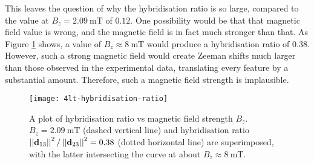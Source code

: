 This leaves the question of why the hybridisation ratio is so large, compared to the value at $B_z=\qty{2.09}{\milli\tesla}$ of $\num{0.12}$. One possibility would be that that magnetic field value is wrong, and the magnetic field is in fact much stronger than that. As Figure \ref{fig:4lt_hybridisation_ratio} shows, a value of $B_z\approx\qty{8}{\milli\tesla}$ would produce a hybridisation ratio of $\num{0.38}$. However, such a strong magnetic field would create Zeeman shifts much larger than those observed in the experimental data, translating every feature by a substantial amount. Therefore, such a magnetic field strength is implausible.

\begin{figure}[h]
\centering
\texttt{[image: 4lt-hybridisation-ratio]}
\caption{\label{fig:4lt_hybridisation_ratio} A plot of hybridisation ratio vs magnetic field strength $B_z$. $B_z=\qty{2.09}{\milli\tesla}$ (dashed vertical line) and hybridisation ratio $\left|\left|\boldsymbol{\mathbf{d}}_{13}\right|\right|^2/\left|\left|\boldsymbol{\mathbf{d}}_{23}\right|\right|^2 = \num{0.38}$ (dotted horizontal line) are superimposed, with the latter intersecting the curve at about $B_z\approx\qty{8}{\milli\tesla}$.}
\end{figure}
